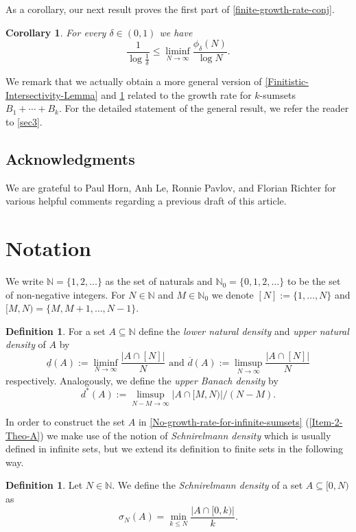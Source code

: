 \documentclass[letter, 11pt]{article}
\theoremstyle{plain} %
\theoremstyle{definition} %
\newtheorem{definition}[theorem]{Definition}
\theoremstyle{plain}
\newcounter{MainTheoremCounter}
\newtheorem{maincorollary}[MainTheoremCounter]{Corollary}
\theoremstyle{plain}
\newcommand{\N}{\mathbb{N}}
\newcommand{\1}{\mathbbm{1}}
\begin{document}
As a corollary, our next result proves the first part of \cref{finite-growth-rate-conj}. 

\begin{maincorollary}\label{Finite-Sumsets-Growth-rate}
    For every $\delta \in (0,1)$ we have 
    $$\frac{1}{\log{\frac{1}{\delta}}}\leq \liminf_{N\to \infty} \frac{\phi_{\delta}(N)}{\log{N}}.$$
\end{maincorollary}
We remark that we actually obtain a more general version of \cref{Finitistic-Intersectivity-Lemma} and \cref{Finite-Sumsets-Growth-rate} related to the growth rate for $k$-sumsets $B_1+\cdots+B_k$. For the detailed statement of the general result, we refer the reader to \cref{sec3}. 

\subsection*{Acknowledgments}
We are grateful to Paul Horn, Anh Le, Ronnie Pavlov, and Florian Richter for various helpful comments regarding a previous draft of this article.

\section{Notation}\label{notation}
We write $\N = \{1,2,\ldots \}$ as the set of naturals and $\N_0 = \{0,1,2,\ldots \}$ to be the set of non-negative integers. For $N\in \N$ and $M \in \N_0$ we denote $[N]:=\{1,\ldots,N\}$ and $[M,N)=\{M,M+1,\ldots,N-1\}$. 

\begin{definition}For a set $A \subseteq \N$
 define the \emph{lower natural density} and \emph{upper natural density} of $A$ by $$\underline{d}(A):=\liminf_{N \to \infty} \frac{|A \cap [N]|}{N} \text{ and }\overline{d}(A):=\limsup_{N \to \infty} \frac{|A \cap [N]|}{N}$$ respectively. Analogously, we define the \emph{upper Banach density} by $$d^*(A):=\limsup_{N-M \to \infty} |A \cap [M,N)|/(N-M).$$
\end{definition}

In order to construct the set $A$ in \cref{No-growth-rate-for-infinite-sumsets} (\ref{Item-2-Theo-A}) we make use of the notion of \textit{Schnirelmann density} which is usually defined in infinite sets, but we extend its definition to finite sets in the following way.  
\begin{definition}
    Let $N\in \N$. We define the \textit{Schnirelmann density} of a set $A\subseteq [0,N)$ as 
    $$\sigma_N(A)= \min_{k\leq N} \frac{|A\cap [0,k)|}{k}. $$
\end{definition}
\end{document}
